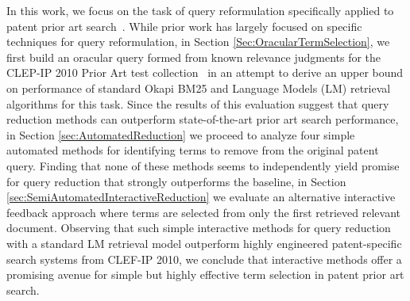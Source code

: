 %
%
In this work, we focus on the task of query
reformulation
specifically applied to patent
prior art
search~\cite{mahdabi2014patent,xue2009transforming}.  While
prior work has largely focused on specific techniques for query
reformulation, in Section \ref{Sec:OracularTermSelection}, we first
build an oracular query formed from known relevance judgments for the
CLEP-IP 2010 Prior Art test collection~\cite{piroi2010clef} in an attempt
to derive an upper bound on performance of standard Okapi BM25 and
Language Models (LM) retrieval algorithms for this task.  Since the
results of this evaluation suggest that query reduction methods can
outperform state-of-the-art prior art search performance, in Section
\ref{sec:AutomatedReduction} we proceed to analyze four simple
automated methods for identifying terms to remove from the original
patent query.  Finding that none of these methods seems to
independently yield promise for query reduction that strongly
outperforms the baseline, in Section
\ref{sec:SemiAutomatedInteractiveReduction} we evaluate an alternative
interactive feedback approach where terms are selected from only the
first retrieved relevant document.  Observing that such simple
interactive methods for query reduction with a standard LM retrieval
model outperform highly engineered patent-specific search systems from
CLEF-IP 2010, we conclude that interactive methods offer a promising
avenue for simple but highly effective term selection in patent prior
art search.



